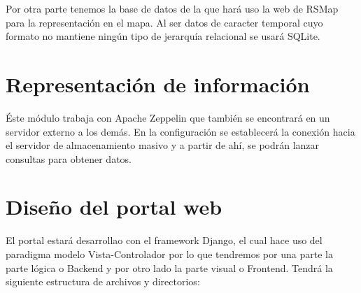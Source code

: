 \bigskip

Por otra parte tenemos la base de datos de la que hará uso la web de RSMap para la representación en el mapa. Al ser datos de caracter temporal cuyo formato no mantiene ningún tipo de jerarquía relacional se usará SQLite.

\section{Representación de información}

Éste módulo trabaja con Apache Zeppelin que también se encontrará en un servidor externo a los demás. En la configuración se establecerá la conexión hacia el servidor de almacenamiento masivo y a partir de ahí, se podrán lanzar consultas para obtener datos.

\newpage

\section{Diseño del portal web}

El portal estará desarrollao con el framework Django, el cual hace uso del paradigma modelo Vista-Controlador por lo que tendremos por una parte la parte lógica o Backend y por otro lado la parte visual o Frontend. Tendrá la siguiente estructura de archivos y directorios:

